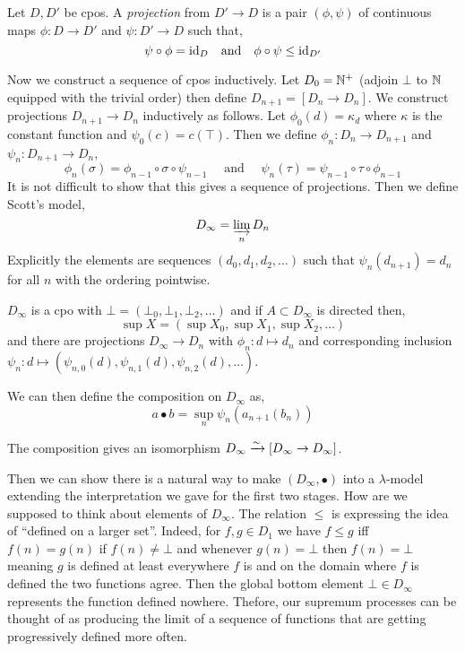 \documentclass[12pt]{article}
\begin{document}
\begin{defn}
Let $D, D'$ be cpos. A \textit{projection} from $D' \to D$ is a pair $(\phi, \psi)$ of continuous maps $\phi : D \to D'$ and $\psi : D' \to D$ such that,
\[ \psi \circ \phi = \mathrm{id}_D \quad \text{and} \quad \phi \circ \psi \le \mathrm{id}_{D'} \]
\end{defn}


Now we construct a sequence of cpos inductively. Let $D_0 = \mathbb{N}^+$ (adjoin $\bot$ to $\mathbb{N}$ equipped with the trivial order) then define $D_{n+1} = [D_n \to D_n]$. We construct projections $D_{n+1} \to D_n$ inductively as follows. Let $\phi_0(d) = \kappa_d$ where $\kappa$ is the constant function and $\psi_0(c) = c(\top)$. Then we define $\phi_n : D_n \to D_{n+1}$ and $\psi_n : D_{n+1} \to D_n$,
\[ \phi_n(\sigma) = \phi_{n-1} \circ \sigma \circ \psi_{n-1} \quad \text{ and } \quad \psi_n(\tau) = \psi_{n-1} \circ \tau \circ \phi_{n-1} \]
It is not difficult to show that this gives a sequence of projections. Then we define Scott's model,
\[ D_{\infty} = \varinjlim_{n} D_n \]
Explicitly the elements are sequences $(d_0, d_1, d_2, \dots)$ such that $\psi_n(d_{n+1}) = d_{n}$ for all $n$ with the ordering pointwise. 

\begin{prop}
$D_\infty$ is a cpo with $\bot = (\bot_0, \bot_1, \bot_2, \dots)$ and if $A \subset D_{\infty}$ is directed then,
\[ \sup X = (\sup X_0, \sup X_1, \sup X_2, \dots) \]
and there are projections $D_{\infty} \to D_n$ with $\phi_n : d \mapsto d_n$ and corresponding inclusion $\psi_n : d \mapsto (\psi_{n,0}(d), \psi_{n,1}(d), \psi_{n,2}(d), \dots)$.
\end{prop}

We can then define the composition on $D_{\infty}$ as,
\[ a \bullet b = \sup_n \psi_n(a_{n+1}(b_n)) \]

\begin{prop}
The composition gives an isomorphism $D_{\infty} \xrightarrow{\sim} [D_{\infty} \to D_{\infty}]$. 
\end{prop}

Then we can show there is a natural way to make $(D_\infty, \bullet)$ into a $\lambda$-model extending the interpretation we gave for the first two stages. How are we supposed to think about elements of $D_\infty$. The relation $\le$ is expressing the idea of ``defined on a larger set''. Indeed, for $f,g \in D_1$ we have $f \le g$ iff $f(n) = g(n)$ if $f(n) \neq \bot$ and whenever $g(n) = \bot$ then $f(n) = \bot$ meaning $g$ is defined at least everywhere $f$ is and on the domain where $f$ is defined the two functions agree. Then the global bottom element $\bot \in D_\infty$ represents the function defined nowhere. Thefore, our supremum processes can be thought of as producing the limit of a sequence of functions that are getting progressively defined more often. 
\end{document}

